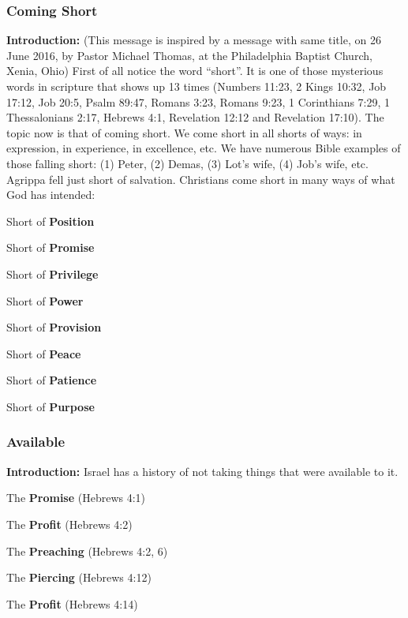 \subsubsection{Coming Short}
\textbf{Introduction:} (This message is inspired by a message with same title, on 26 June 2016, by Pastor Michael Thomas, at the Philadelphia Baptist Church, Xenia, Ohio) First of all notice the word ``short''.  It is one of those mysterious words in scripture that shows up 13 times (Numbers 11:23, 2 Kings 10:32, Job 17:12, Job 20:5, Psalm 89:47, Romans 3:23, Romans 9:23, 1 Corinthians 7:29, 1 Thessalonians 2:17, Hebrews 4:1, Revelation 12:12 and Revelation 17:10). The topic now is that of coming short. We come short in all shorts of ways: in expression, in experience, in excellence, etc.  We have numerous Bible examples of those falling short: (1) Peter, (2) Demas, (3) Lot's wife, (4) Job's wife, etc. Agrippa fell just short of salvation. Christians come short in many ways of what God has intended:
\begin{compactenum}[I.][8]
    \item Short of \textbf{Position}
    \item Short of \textbf{Promise}
    \item Short of \textbf{Privilege}
    \item Short of \textbf{Power}
    \item Short of \textbf{Provision}
    \item Short of \textbf{Peace}
    \item Short of \textbf{Patience}
    \item Short of \textbf{Purpose}
\end{compactenum}


\subsubsection{Available}
\textbf{Introduction:} Israel has a history of not taking things that were available to it.
\begin{compactenum}[I.][8]
    \item The \textbf{Promise}  (Hebrews 4:1)
    \item The \textbf{Profit}  (Hebrews 4:2)
    \item The \textbf{Preaching}  (Hebrews 4:2, 6) 
    \item The \textbf{Piercing}  (Hebrews 4:12)
    \item The \textbf{Profit}  (Hebrews 4:14)
\end{compactenum}